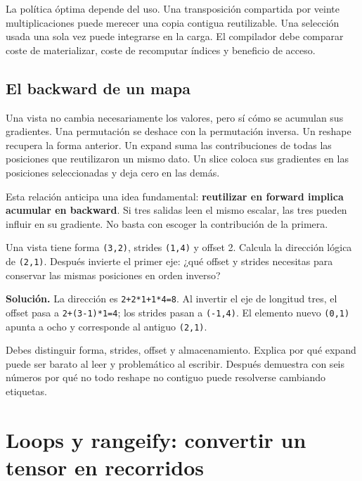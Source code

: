 \documentclass[12pt,a4paper,oneside]{report}
\begin{document}
La política óptima depende del uso. Una transposición compartida por veinte multiplicaciones puede merecer una copia contigua reutilizable. Una selección usada una sola vez puede integrarse en la carga. El compilador debe comparar coste de materializar, coste de recomputar índices y beneficio de acceso.

\section{El backward de un mapa}
Una vista no cambia necesariamente los valores, pero sí cómo se acumulan sus gradientes. Una permutación se deshace con la permutación inversa. Un reshape recupera la forma anterior. Un expand suma las contribuciones de todas las posiciones que reutilizaron un mismo dato. Un slice coloca sus gradientes en las posiciones seleccionadas y deja cero en las demás.

Esta relación anticipa una idea fundamental: \textbf{reutilizar en forward implica acumular en backward}. Si tres salidas leen el mismo escalar, las tres pueden influir en su gradiente. No basta con escoger la contribución de la primera.

\begin{practica}
Una vista tiene forma \texttt{(3,2)}, strides \texttt{(1,4)} y offset 2. Calcula la dirección lógica de \texttt{(2,1)}. Después invierte el primer eje: ¿qué offset y strides necesitas para conservar las mismas posiciones en orden inverso?

\end{practica}
\textbf{Solución.} La dirección es \texttt{2+2*1+1*4=8}. Al invertir el eje de longitud tres, el offset pasa a \texttt{2+(3-1)*1=4}; los strides pasan a \texttt{(-1,4)}. El elemento nuevo \texttt{(0,1)} apunta a ocho y corresponde al antiguo \texttt{(2,1)}.

\begin{comprueba}
Debes distinguir forma, strides, offset y almacenamiento. Explica por qué expand puede ser barato al leer y problemático al escribir. Después demuestra con seis números por qué no todo reshape no contiguo puede resolverse cambiando etiquetas.

\end{comprueba}
\chapter{Loops y rangeify: convertir un tensor en recorridos}
\label{ch:rangeify}
\end{document}
